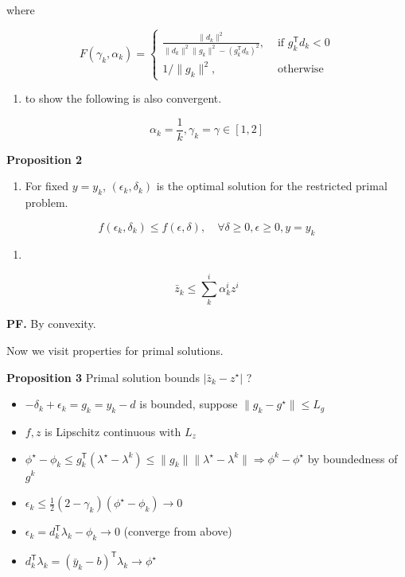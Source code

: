 \documentclass[
  a4paper,
,tablecaptionabove
]{scrartcl}
\numberwithin{equation}{section}
\providecommand{\tightlist}{%
  \setlength{\itemsep}{0pt}\setlength{\parskip}{0pt}}
\begin{document}
where

\[F(\gamma_{k}, \alpha_{k})=\begin{cases}
    \frac{\|d_k\|^2}{\|d_k\|^2 \|g_k\|^2-(g_k^\mathsf{T} d_k)^{2}}, & \textrm { if } g_k^\mathsf{T} d_k <0 \\
    1/\|g_k\|^2,                                                    & \text { otherwise }\end{cases}\]

\begin{enumerate}
  \def\labelenumi{(\alph{enumi})}
  \setcounter{enumi}{1}
  \tightlist
  \item
        to show the following is also convergent.
\end{enumerate}

\[\alpha_k = \frac{1}{k}, \gamma_k = \gamma \in [1, 2]\]

\textbf{Proposition 2}

\begin{enumerate}
  \def\labelenumi{(\alph{enumi})}
  \tightlist
  \item
        For fixed \(y=y_k\), \((\epsilon_k, \delta_k)\) is the optimal
        solution for the restricted primal problem.
\end{enumerate}

\[f(\epsilon_k, \delta_k) \le f(\epsilon, \delta), \quad \forall \delta\ge 0, \epsilon\ge 0, y= y_k\]

\begin{enumerate}
  \def\labelenumi{(\alph{enumi})}
  \setcounter{enumi}{1}
  \tightlist
  \item
\end{enumerate}

\[\bar z_k \le \sum^i_k \alpha^i_k z^i\]

\textbf{PF.} By convexity.

Now we visit properties for primal solutions.

\textbf{Proposition 3} Primal solution bounds \(|\bar z_k - z^\star|\) ?

\begin{itemize}
  \tightlist
  \item
        \(- \delta_k + \epsilon_k = g_k = y_k -d\) is bounded, suppose
        \(\|g_k - g^\star\|\le L_g\)
  \item
        \(f, z\) is Lipschitz continuous with \(L_z\)
  \item
        \(\phi^\star - \phi_k \le g_k^\mathsf{T} (\lambda^\star - \lambda^k)\le \|g_k\|\|\lambda^\star - \lambda^k\|\Rightarrow \phi^k -\phi^\star\)
        by boundedness of \(g^k\)
  \item
        \(\epsilon_k \le \frac{1}{2}(2 - \gamma_k) ( \phi^\star - \phi_k) \to 0\)
  \item
        \(\epsilon_k = d_k^\mathsf{T} \lambda_k - \phi_k \to 0\) (converge
        from above)
  \item
        \(d_k^\mathsf{T} \lambda_k = (\bar y_k - b)^\mathsf{T} \lambda_k \to \phi^\star\)
\end{itemize}
\end{document}
